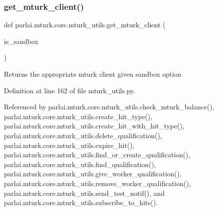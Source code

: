 \subsubsection{\texorpdfstring{get\+\_\+mturk\+\_\+client()}{get\_mturk\_client()}}
{\footnotesize\ttfamily def parlai.\+mturk.\+core.\+mturk\+\_\+utils.\+get\+\_\+mturk\+\_\+client (\begin{DoxyParamCaption}\item[{}]{is\+\_\+sandbox }\end{DoxyParamCaption})}

\begin{DoxyVerb}Returns the appropriate mturk client given sandbox option\end{DoxyVerb}
 

Definition at line 162 of file mturk\+\_\+utils.\+py.



Referenced by parlai.\+mturk.\+core.\+mturk\+\_\+utils.\+check\+\_\+mturk\+\_\+balance(), parlai.\+mturk.\+core.\+mturk\+\_\+utils.\+create\+\_\+hit\+\_\+type(), parlai.\+mturk.\+core.\+mturk\+\_\+utils.\+create\+\_\+hit\+\_\+with\+\_\+hit\+\_\+type(), parlai.\+mturk.\+core.\+mturk\+\_\+utils.\+delete\+\_\+qualification(), parlai.\+mturk.\+core.\+mturk\+\_\+utils.\+expire\+\_\+hit(), parlai.\+mturk.\+core.\+mturk\+\_\+utils.\+find\+\_\+or\+\_\+create\+\_\+qualification(), parlai.\+mturk.\+core.\+mturk\+\_\+utils.\+find\+\_\+qualification(), parlai.\+mturk.\+core.\+mturk\+\_\+utils.\+give\+\_\+worker\+\_\+qualification(), parlai.\+mturk.\+core.\+mturk\+\_\+utils.\+remove\+\_\+worker\+\_\+qualification(), parlai.\+mturk.\+core.\+mturk\+\_\+utils.\+send\+\_\+test\+\_\+notif(), and parlai.\+mturk.\+core.\+mturk\+\_\+utils.\+subscribe\+\_\+to\+\_\+hits().

